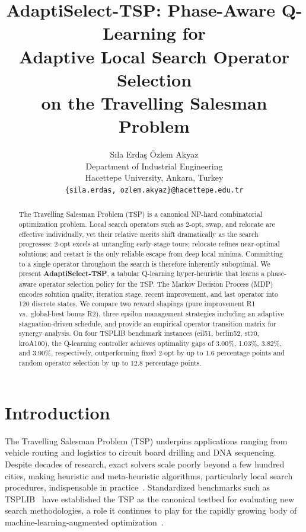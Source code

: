 \documentclass{article}
\title{AdaptiSelect-TSP: Phase-Aware Q-Learning for\\
Adaptive Local Search Operator Selection\\
on the Travelling Salesman Problem}
\author{
  S{\i}la Erda\c{s} \quad Özlem Akyaz \\
  Department of Industrial Engineering \\
  Hacettepe University, Ankara, Turkey \\
  \texttt{\{sila.erdas, ozlem.akyaz\}@hacettepe.edu.tr}
}
\begin{document}
\maketitle

\begin{abstract}
The Travelling Salesman Problem (TSP) is a canonical NP-hard combinatorial
optimization problem. Local search operators such as 2-opt, swap, and relocate
are effective individually, yet their relative merits shift dramatically as the
search progresses: 2-opt excels at untangling early-stage tours; relocate
refines near-optimal solutions; and restart is the only reliable escape from
deep local minima. Committing to a single operator throughout the search is
therefore inherently suboptimal. We present \textbf{AdaptiSelect-TSP}, a
tabular Q-learning hyper-heuristic that learns a phase-aware operator selection
policy for the TSP. The Markov Decision Process (MDP) encodes solution quality,
iteration stage, recent improvement, and last operator into 120 discrete states.
We compare two reward shapings (pure improvement R1 vs.\ global-best bonus R2),
three epsilon management strategies including an adaptive stagnation-driven
schedule, and provide an empirical operator transition matrix for synergy
analysis. On four TSPLIB benchmark instances (eil51, berlin52, st70, kroA100),
the Q-learning controller achieves optimality gaps of 3.00\%, 1.03\%, 3.82\%,
and 3.90\%, respectively, outperforming fixed 2-opt by up to 1.6 percentage
points and random operator selection by up to 12.8 percentage points.
\end{abstract}

\section{Introduction}

The Travelling Salesman Problem (TSP) underpins applications ranging from
vehicle routing and logistics to circuit board drilling and DNA sequencing.
Despite decades of research, exact solvers scale poorly beyond a few hundred
cities, making heuristic and meta-heuristic algorithms, particularly local
search procedures, indispensable in practice~\citep{reinelt1991tsplib}.
Standardized benchmarks such as TSPLIB~\citep{reinelt1991tsplib} have
established the TSP as the canonical testbed for evaluating new search
methodologies, a role it continues to play for the rapidly growing body of
machine-learning-augmented optimization~\citep{mazyavkina2021rl,chung2025neural}.
\end{document}
